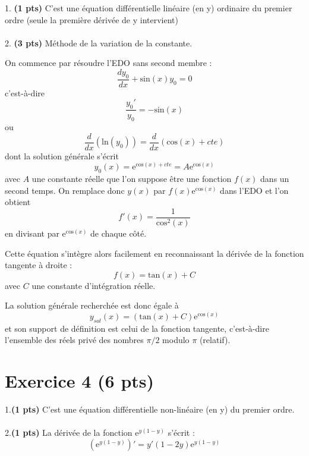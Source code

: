 \documentclass[fleqn]{article}
\begin{document}
{1. \textbf{(1 pts)} C'est une équation différentielle linéaire (en
y) ordinaire du premier ordre (seule la première dérivée de y intervient)}\\
{}\\

{2. \textbf{(3 pts)} Méthode de la variation de la constante.}

{On commence par résoudre l'EDO sans second membre
:
\[
\frac{dy_{0}}{dx}+\textrm{sin}\left(x\right)y_{0}=0
\]
c'est-à-dire
\[
\frac{y_{0}'}{y_{0}}=-\textrm{sin}\left(x\right)
\]
ou
\[
\frac{d}{dx}\left(\textrm{ln}\left(y_{0}\right)\right)=\frac{d}{dx}\left(\textrm{cos}\left(x\right)+cte\right)
\]
dont la solution générale s'écrit
\[
y_{0}\left(x\right)=\textrm{e}^{\textrm{cos}\left(x\right)+cte}=A\textrm{e}^{\textrm{cos}\left(x\right)}
\]
avec $A$ une constante réelle que l'on suppose être une fonction
$f\left(x\right)$ dans un second temps. On remplace donc $y\left(x\right)$
par $f\left(x\right)\textrm{e}^{\textrm{cos}\left(x\right)}$ dans
l'EDO et l'on obtient
\[
f'\left(x\right)=\frac{1}{\textrm{cos}^{2}\left(x\right)}
\]
en divisant par $\textrm{e}^{\textrm{cos}\left(x\right)}$ de chaque
côté.}

{Cette équation s'intègre alors facilement en reconnaissant
la dérivée de la fonction tangente à droite :
\[
f\left(x\right)=\textrm{tan}\left(x\right)+C
\]
avec $C$ une constante d'intégration réelle.}

{La solution générale recherchée est donc égale à
\[
y_{sol}\left(x\right)=\left(\textrm{tan}\left(x\right)+C\right)\textrm{e}^{\textrm{cos}\left(x\right)}
\]
et son support de définition est celui de la fonction tangente, c'est-à-dire
l'ensemble des réels privé des nombres $\pi/2$ modulo $\pi$ (relatif).}

\section{Exercice 4 \textbf{(6 pts)}}


{1.\textbf{(1 pts)} C'est une équation différentielle non-linéaire
(en y) du premier ordre.}\\
{}\\

{2.\textbf{(1 pts)} La dérivée de la fonction $\textrm{e}^{y\left(1-y\right)}$
s'écrit :
\[
\left(\textrm{e}^{y\left(1-y\right)}\right)'=y'\left(1-2y\right)\textrm{e}^{y\left(1-y\right)}
\]
}\\
{}\\
\end{document}

